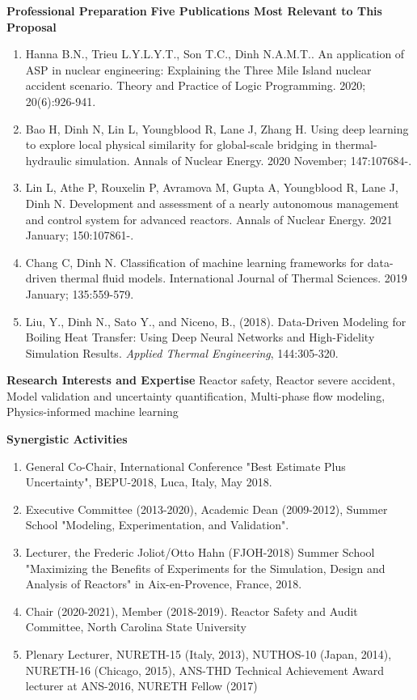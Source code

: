 \documentclass[11pt,letterpaper,english]{article}
\begin{document}
\begin{flushleft} {\bf Professional Preparation}
\vspace{.04in}
{\bf Five Publications Most Relevant to This Proposal}
\vspace{-6pt}
\begin{enumerate} \itemsep1pt \parskip0pt 
\item Hanna B.N., Trieu L.Y.L.Y.T., Son T.C., Dinh N.A.M.T.. An application of ASP in nuclear engineering: Explaining the Three Mile Island nuclear accident scenario. Theory and Practice of Logic Programming. 2020; 20(6):926-941.
\item Bao H, Dinh N, Lin L, Youngblood R, Lane J, Zhang H. Using deep learning to explore local physical similarity for global-scale bridging in thermal-hydraulic simulation. Annals of Nuclear Energy. 2020 November; 147:107684-.
\item Lin L, Athe P, Rouxelin P, Avramova M, Gupta A, Youngblood R, Lane J, Dinh N. Development and assessment of a nearly autonomous management and control system for advanced reactors. Annals of Nuclear Energy. 2021 January; 150:107861-.
\item Chang C, Dinh N. Classification of machine learning frameworks for data-driven thermal fluid models. International Journal of Thermal Sciences. 2019 January; 135:559-579.
\item Liu, Y., Dinh N., Sato Y., and Niceno, B., (2018). Data-Driven Modeling for Boiling Heat Transfer: Using Deep Neural Networks and High-Fidelity Simulation Results. \textit{Applied Thermal Engineering}, 144:305-320.
\end{enumerate}

\vspace{-6pt}
{\bf Research Interests and Expertise}
{\parindent 16pt
Reactor safety, Reactor severe accident, Model validation and uncertainty quantification, Multi-phase flow modeling, Physics-informed machine learning
}

\vspace{.04in}
{\bf Synergistic Activities}
\vspace{-6pt}
\begin{enumerate} \itemsep1pt \parskip0pt 
\item General Co-Chair, International Conference "Best Estimate Plus Uncertainty", BEPU-2018, Luca, Italy, May 2018.
\item Executive Committee (2013-2020), Academic Dean (2009-2012), Summer School "Modeling, Experimentation, and Validation".
\item Lecturer, the Frederic Joliot/Otto Hahn (FJOH-2018) Summer School "Maximizing the Benefits of Experiments for the Simulation, Design and Analysis of Reactors" in Aix-en-Provence, France, 2018.
\item Chair (2020-2021), Member (2018-2019). Reactor Safety and Audit Committee, North Carolina State University
\item Plenary Lecturer, NURETH-15 (Italy, 2013), NUTHOS-10 (Japan, 2014), NURETH-16 (Chicago, 2015), ANS-THD Technical Achievement Award lecturer at ANS-2016, NURETH Fellow (2017)
\end{enumerate}


\end{flushleft}
\end{document}

